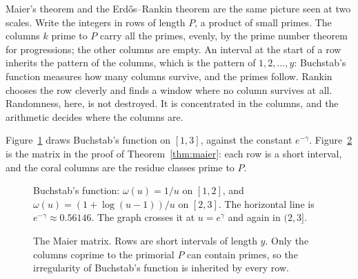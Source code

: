\begin{beauty}
Maier's theorem and the Erd\H{o}s--Rankin theorem are the same picture seen at two scales. Write the integers in rows of length $P$, a product of small primes. The columns $k$ prime to $P$ carry all the primes, evenly, by the prime number theorem for progressions; the other columns are empty. An interval at the start of a row inherits the pattern of the columns, which is the pattern of $1,2,\dots,y$: Buchstab's function measures how many columns survive, and the primes follow. Rankin chooses the row cleverly and finds a window where no column survives at all. Randomness, here, is not destroyed. It is concentrated in the columns, and the arithmetic decides where the columns are.
\end{beauty}

Figure~\ref{fig:v15c02-buchstab} draws Buchstab's function on \([1,3]\), against the constant \(e^{-\gamma}\). Figure~\ref{fig:v15c02-gaps} is the matrix in the proof of Theorem~\ref{thm:maier}: each row is a short interval, and the coral columns are the residue classes prime to \(P\).

\begin{figure}[ht]
\centering
{}
\caption{Buchstab's function: \(\omega(u)=1/u\) on \([1,2]\), and \(\omega(u)=(1+\log(u-1))/u\) on \([2,3]\). The horizontal line is \(e^{-\gamma}\approx0.56146\). The graph crosses it at \(u=e^{\gamma}\) and again in \((2,3]\).}
\label{fig:v15c02-buchstab}
\end{figure}

\begin{figure}[ht]
\centering
{}
\caption{The Maier matrix. Rows are short intervals of length \(y\). Only the columns coprime to the primorial \(P\) can contain primes, so the irregularity of Buchstab's function is inherited by every row.}
\label{fig:v15c02-gaps}
\end{figure}
